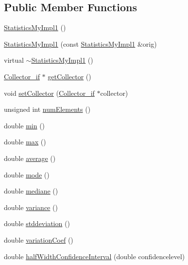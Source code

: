 \subsection*{Public Member Functions}
\begin{DoxyCompactItemize}
\item 
\hyperlink{class_statistics_my_impl1_a74965279c4d06cea81c4f64903a21b74}{Statistics\-My\-Impl1} ()
\item 
\hyperlink{class_statistics_my_impl1_a887576759d5f1d83de788fda0c1efb84}{Statistics\-My\-Impl1} (const \hyperlink{class_statistics_my_impl1}{Statistics\-My\-Impl1} \&orig)
\item 
virtual \hyperlink{class_statistics_my_impl1_abac2ae9a1f5c27467969017fb0bc0298}{$\sim$\-Statistics\-My\-Impl1} ()
\item 
\hyperlink{class_collector__if}{Collector\-\_\-if} $\ast$ \hyperlink{class_statistics_my_impl1_a7c01fbd99fabf6edd4e039c125a6eb3d}{get\-Collector} ()
\item 
void \hyperlink{class_statistics_my_impl1_a220ad0da6ffa6dc237dcd182f35c3221}{set\-Collector} (\hyperlink{class_collector__if}{Collector\-\_\-if} $\ast$collector)
\item 
unsigned int \hyperlink{class_statistics_my_impl1_a2849b72a9be58c379b5a97281082e63a}{num\-Elements} ()
\item 
double \hyperlink{class_statistics_my_impl1_a6342489ef309c427fd2de529e8d27f93}{min} ()
\item 
double \hyperlink{class_statistics_my_impl1_a74d67916a66528d0813ed066788f0010}{max} ()
\item 
double \hyperlink{class_statistics_my_impl1_aed2e463c216a215c23004904c5fdb520}{average} ()
\item 
double \hyperlink{class_statistics_my_impl1_a3bdde1e171fbfac219d8f22e654deb8d}{mode} ()
\item 
double \hyperlink{class_statistics_my_impl1_aa50da1ebb25c6c8fb30b8f4355ac5a89}{mediane} ()
\item 
double \hyperlink{class_statistics_my_impl1_afa5cfa9ad68d31cb2707dbfccf8fb5c5}{variance} ()
\item 
double \hyperlink{class_statistics_my_impl1_ac5bb46f4782920b8be4a297b0ae2bd5e}{stddeviation} ()
\item 
double \hyperlink{class_statistics_my_impl1_abe90460ab3f591c78a60a1924ebe43f5}{variation\-Coef} ()
\item 
double \hyperlink{class_statistics_my_impl1_ac0211d104dab15928738fea6990ccad8}{half\-Width\-Confidence\-Interval} (double confidencelevel)

\end{DoxyCompactItemize}
